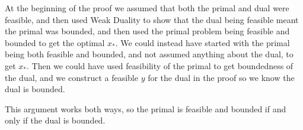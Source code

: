 \documentclass{article}
\begin{document}
At the beginning of the proof we assumed that both the primal and dual were feasible, and then used
Weak Duality to show that the dual being feasible meant the primal was bounded, and then used the
primal problem being feasible and bounded to get the optimal $x_*$. We could instead have started
with the primal being both feasible and bounded, and not assumed anything about the dual, to get
$x_*$. Then we could have used feasibility of the primal to get boundedness of the dual, and we
construct a feasible $y$ for the dual in the proof so we know the dual is bounded.

This argument works both ways, so the primal is feasible and bounded if and only if the dual is
bounded.
\end{document}
